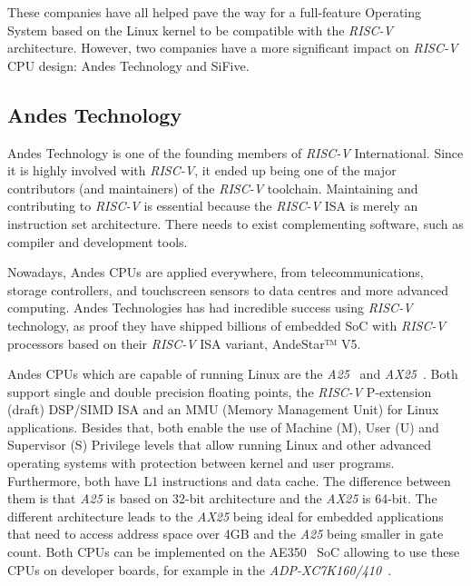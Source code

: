 
These companies have all helped pave the way for a full-feature Operating System based on the Linux kernel to be compatible with the \textit{RISC-V} architecture. However, two companies have a more significant impact on \textit{RISC-V} CPU design: Andes Technology and SiFive.

\subsection{Andes Technology}
Andes Technology is one of the founding members of \textit{RISC-V} International. Since it is highly involved with \textit{RISC-V}, it ended up being one of the major contributors (and maintainers) of the \textit{RISC-V} toolchain. Maintaining and contributing to \textit{RISC-V} is essential because the \textit{RISC-V} ISA is merely an instruction set architecture. There needs to exist complementing software, such as compiler and development tools.

Nowadays, Andes CPUs are applied everywhere, from telecommunications, storage controllers, and touchscreen sensors to data centres and more advanced computing. Andes Technologies has had incredible success using \textit{RISC-V} technology, as proof they have shipped billions of embedded SoC with \textit{RISC-V} processors based on their \textit{RISC-V} ISA variant, AndeStar™ V5.

Andes CPUs which are capable of running Linux are the \textit{A25}~\cite{a25} and \textit{AX25}~\cite{ax25}. Both support single and double precision floating points, the \textit{RISC-V} P-extension (draft) DSP/SIMD ISA and an MMU (Memory Management Unit) for Linux applications. Besides that, both enable the use of Machine (M), User (U) and Supervisor (S) Privilege levels that allow running Linux and other advanced operating systems with protection between kernel and user programs. Furthermore, both have L1 instructions and data cache. The difference between them is that \textit{A25} is based on 32-bit architecture and the \textit{AX25} is 64-bit. The different architecture leads to the \textit{AX25} being ideal for embedded applications that need to access address space over 4GB and the \textit{A25} being smaller in gate count. Both CPUs can be implemented on the AE350~\cite{ae350} SoC allowing to use these CPUs on developer boards, for example in the \textit{ADP-XC7K160/410}~\cite{adp-xc7k160}.


